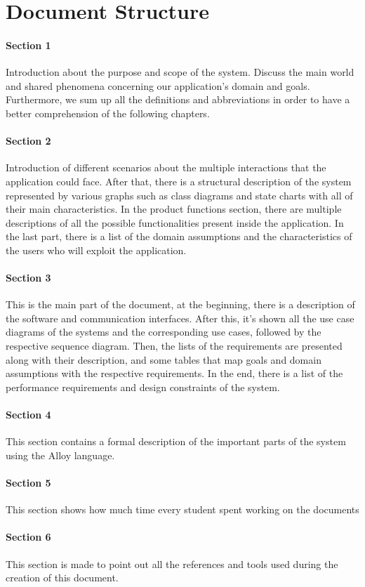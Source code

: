\section{Document Structure}
\label{sec:documentStructure}
\paragraph{Section 1}
Introduction about the purpose and scope of the system. Discuss the main world and shared phenomena concerning our application’s domain and goals. Furthermore, we sum up all the definitions and abbreviations in order to have a better comprehension of the following chapters.
\paragraph{Section 2}
Introduction of different scenarios about the multiple interactions that the application could face. After that, there is a structural description of the system represented by various graphs such as class diagrams and state charts with all of their main characteristics. In the product functions section, there are multiple descriptions of all the possible functionalities present inside the application. In the last part, there is a list of the domain assumptions and the
characteristics of the users who will exploit the application.
\paragraph{Section 3}
This is the main part of the document, at the beginning, there is a description of the software and communication interfaces. After this, it’s shown all the use case diagrams of the systems and the corresponding use cases, followed by the respective sequence diagram. Then, 
the lists of the requirements are presented along with their description, and some tables that map goals and domain assumptions with the respective requirements.  In the end, there is a list of the performance requirements and design constraints of the system.
\paragraph{Section 4}
This section contains a formal description of the important parts of the system using
the Alloy language. 
\paragraph{Section 5}
This section shows how much time every student spent working on the documents
\paragraph{Section 6}
This section is made to point out all the references and tools used during the
creation of this document.